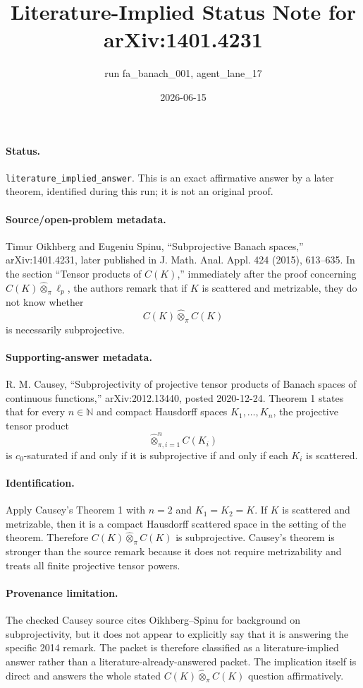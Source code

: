 \documentclass[11pt]{article}
\title{Literature-Implied Status Note for arXiv:1401.4231}
\author{run fa\_banach\_001, agent\_lane\_17}
\date{2026-06-15}
\begin{document}
\maketitle

\paragraph{Status.}
\texttt{literature\_implied\_answer}. This is an exact affirmative answer by
a later theorem, identified during this run; it is not an original proof.

\paragraph{Source/open-problem metadata.}
Timur Oikhberg and Eugeniu Spinu, ``Subprojective Banach spaces,''
arXiv:1401.4231, later published in J. Math. Anal. Appl. 424 (2015),
613--635. In the section ``Tensor products of \(C(K)\),'' immediately after
the proof concerning \(C(K)\widehat{\otimes}_\pi \ell_p\), the authors remark
that if \(K\) is scattered and metrizable, they do not know whether
\[
  C(K)\widehat{\otimes}_\pi C(K)
\]
is necessarily subprojective.

\paragraph{Supporting-answer metadata.}
R. M. Causey, ``Subprojectivity of projective tensor products of Banach spaces
of continuous functions,'' arXiv:2012.13440, posted 2020-12-24. Theorem 1
states that for every \(n\in\mathbb N\) and compact Hausdorff spaces
\(K_1,\ldots,K_n\), the projective tensor product
\[
  \widehat{\otimes}_{\pi,i=1}^n C(K_i)
\]
is \(c_0\)-saturated if and only if it is subprojective if and only if each
\(K_i\) is scattered.

\paragraph{Identification.}
Apply Causey's Theorem 1 with \(n=2\) and \(K_1=K_2=K\). If \(K\) is scattered
and metrizable, then it is a compact Hausdorff scattered space in the setting
of the theorem. Therefore \(C(K)\widehat{\otimes}_\pi C(K)\) is
subprojective. Causey's theorem is stronger than the source remark because it
does not require metrizability and treats all finite projective tensor powers.

\paragraph{Provenance limitation.}
The checked Causey source cites Oikhberg--Spinu for background on
subprojectivity, but it does not appear to explicitly say that it is answering
the specific 2014 remark. The packet is therefore classified as a
literature-implied answer rather than a literature-already-answered packet.
The implication itself is direct and answers the whole stated
\(C(K)\widehat{\otimes}_\pi C(K)\) question affirmatively.
\end{document}
